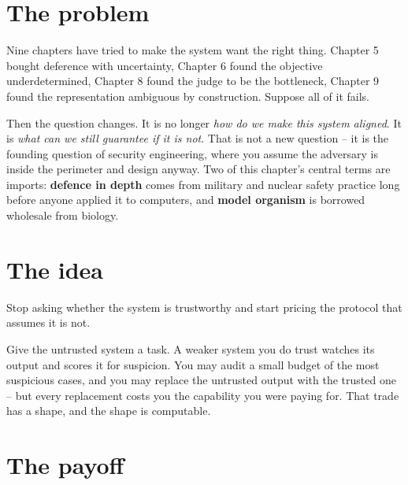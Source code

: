 \section*{The problem}

Nine chapters have tried to make the system want the right thing. Chapter 5 bought deference with uncertainty, Chapter 6 found the objective underdetermined, Chapter 8 found the judge to be the bottleneck, Chapter 9 found the representation ambiguous by construction. Suppose all of it fails.

Then the question changes. It is no longer \emph{how do we make this system aligned}. It is \emph{what can we still guarantee if it is not}. That is not a new question -- it is the founding question of security engineering, where you assume the adversary is inside the perimeter and design anyway. Two of this chapter's central terms are imports: \textbf{defence in depth} comes from military and nuclear safety practice long before anyone applied it to computers, and \textbf{model organism} is borrowed wholesale from biology.

\section*{The idea}

Stop asking whether the system is trustworthy and start pricing the protocol that assumes it is not.

Give the untrusted system a task. A weaker system you do trust watches its output and scores it for suspicion. You may audit a small budget of the most suspicious cases, and you may replace the untrusted output with the trusted one -- but every replacement costs you the capability you were paying for. That trade has a shape, and the shape is computable.

\section*{The payoff}

